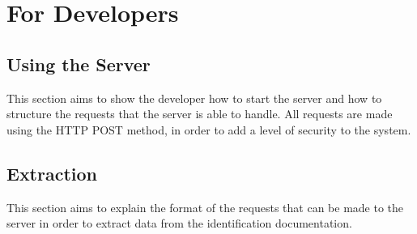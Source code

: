 \documentclass{article}
\begin{document}
\section{For Developers}
    \subsection{Using the Server}
    This section aims to show the developer how to start the server and how to structure the requests that the server is able to handle. All requests are made using the HTTP POST method, in order to add a level of security to the system.
    
    \subsection{Extraction}
        This section aims to explain the format of the requests that can be made to the server in order to extract data from the identification documentation.
\end{document}
